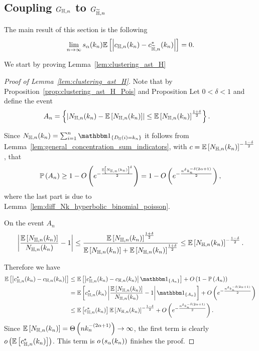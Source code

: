 \subsection{Coupling $G_{\mathbb{H},n}$ to $G_{\widetilde{\mathbb{H}},n}$}\label{ssec:coupling_H_HP}

The main result of this section is the following
\[
	\lim_{n \to \infty} s_\alpha(k_n)\mathbb{E}\left[\left|c_{\mathbb{H},n}(k_n) - c_{\widetilde{\mathbb{H}},n}^\ast(k_n)\right|\right] = 0.
\]

We start by proving Lemma~\ref{lem:clustering_ast_H}


\begin{proof}[Proof of Lemma~\ref{lem:clustering_ast_H}]
Note that by Proposition~\ref{prop:clustering_ast_H_Pois} and Proposition
Let $0 < \delta < 1$ and define the event
\begin{align*}
	A_n &= \left\{\left|N_{\mathbb{H},n}(k_n) - \mathbb{E}\left[N_{\mathbb{H},n}(k_n)\right]\right| \le \mathbb{E}\left[N_{\mathbb{H},n}(k_n)\right]^{\frac{1 + \delta}{2}}\right\}.
\end{align*}

Since $N_{\H,n}(k_n) = \sum_{i = 1}^n \ind{D_\H(i) = k_n}$ it follows from Lemma~\ref{lem:general_concentration_sum_indicators}, with $c = \mathbb{E}\left[N_{\mathbb{H},n}(k_n)\right]^{-\frac{1-\delta}{2}}$, that
\begin{equation}\label{eq:clustering_ast_H_prob_A}
	\mathbb{P}\left(A_n\right) \ge 1 - O\left(e^{-\frac{\mathbb{E}\left[N_{\mathbb{H},n}(k_n)\right]^\delta}{2}}\right) = 1 - O\left(e^{-\frac{n^\delta k_n^{-\delta(2\alpha + 1)}}{2}}\right),
\end{equation}
where the last part is due to Lemma~\ref{lem:diff_Nk_hyperbolic_binomial_poisson}. 

On the event $A_n$
\[
	\left|\frac{\mathbb{E}\left[N_{\mathbb{H},n}(k_n)\right]}{N_{\mathbb{H},n}(k_n)} - 1\right| 
	\le \frac{\mathbb{E}\left[N_{\mathbb{H},n}(k_n)\right]^{\frac{1 + \delta}{2}}}{\mathbb{E}\left[N_{\mathbb{H},n}(k_n)\right]+\mathbb{E}\left[N_{\mathbb{H},n}(k_n)\right]^{\frac{1 + \delta}{2}}}
	\le \mathbb{E}\left[N_{\mathbb{H},n}(k_n)\right]^{-\frac{1 - \delta}{2}}.
\]

Therefore we have
\begin{align*}
	\Exp{\left|c_{\H, n}^\ast(k_n) - c_{\H, n}(k_n)\right|}
	&\le \Exp{\left|c_{\H, n}^\ast(k_n) - c_{\H, n}(k_n)\right|\ind{A_n}} + \bigO{1 - \Prob{A_n}}\\
	&= \Exp{c_{\H, n}^\ast(k_n)\left|\frac{\Exp{N_{\H,n}(k_n)}}{N_{\H,n}(k_n)} - 1\right|\ind{A_n}}
		+ \bigO{e^{-\frac{n^\delta k_n^{-\delta(2\alpha + 1)}}{2}}}\\
	&\le \Exp{c_{\H, n}^\ast(k_n)}\Exp{N_{\H,n}(k_n)}^{-\frac{1 - \delta}{2}} 
		+ \bigO{e^{-\frac{n^\delta k_n^{-\delta(2\alpha + 1)}}{2}}}.
\end{align*}
Since $\mathbb{E}\left[N_{\mathbb{H},n}(k_n)\right] = \Theta\left(n k_n^{-(2\alpha + 1)}\right) \to \infty$, the first term is clearly $o\left(\mathbb{E}\left[c_{\mathbb{H}, n}^\ast(k_n)\right]\right)$. This term is $o\left(s_\alpha(k_n)\right)$ finishes the proof. 
\end{proof}

